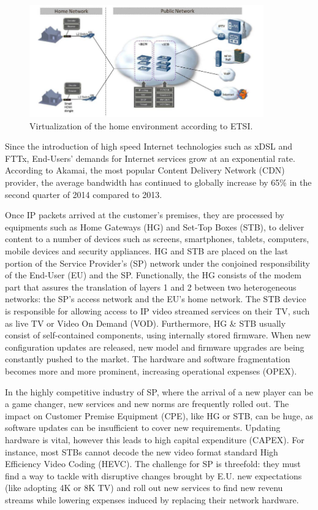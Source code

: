 \begin{figure}
  \begin{center}
    \includegraphics[width=0.90\textwidth,natwidth=769,natheight=369]{fig/vHGetsi.png}
  \end{center}
  \caption{ Virtualization of the home environment according to ETSI.
    \label{fig:etsi-vision}
  }
\end{figure}

Since the introduction of high speed Internet technologies such as xDSL and FTTx, End-Users' demands for Internet services grow at an exponential rate.
According to Akamai, the most popular Content Delivery Network (CDN) provider, the average bandwidth has continued to globally increase by 65\% in the second quarter of 2014 \cite{_akamais_2014} compared to 2013.

Once IP packets arrived at the customer's premises, they are processed by equipments such as Home Gateways (HG) and Set-Top Boxes (STB), to deliver content to a number of devices such as screens, smartphones, tablets, computers, mobile devices and security appliances.
HG and STB are placed on the last portion of the Service Provider's (SP) network under the conjoined responsibility of the End-User (EU) and the SP.
Functionally, the HG consists of the modem part that assures the translation of layers 1 and 2 between two heterogeneous networks: the SP's access network and the EU's home network.
The STB device is responsible for allowing access to IP video streamed services on their TV, such as live TV or Video On Demand (VOD).
Furthermore, HG \& STB usually consist of self-contained components, using internally stored firmware.
When new configuration updates are released, new model and firmware upgrades are being constantly pushed to the market.
The hardware and software fragmentation becomes more and more prominent, increasing operational expenses (OPEX). 

In the highly competitive industry of SP, where the arrival of a new player can be a game changer, new services and new norms are frequently rolled out.	
The impact on Customer Premise Equipment (CPE), like HG or STB, can be huge, as software updates can be insufficient to cover new requirements.
Updating hardware is vital, however this leads to high capital expenditure (CAPEX).
For instance, most STBs cannot decode the new video format standard  High Efficiency Video Coding (HEVC). 
The challenge for SP is threefold: they must find a way to tackle with disruptive changes brought by E.U. new expectations (like adopting 4K or 8K TV) and roll out new services to find new revenu streams while lowering expenses induced by replacing their network hardware.

